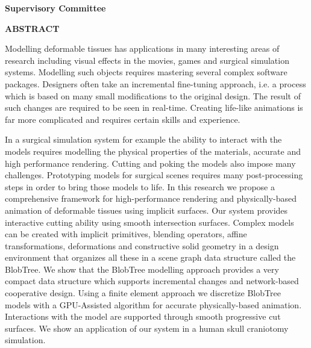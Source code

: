 \pagebreak
\newpage
{}

\noindent \textbf{Supervisory Committee}
\tpbreak
\panel

\begin{center}
\textbf{ABSTRACT}
\end{center}
Modelling deformable tissues has applications in many interesting areas of research
including visual effects in the movies, games and surgical simulation systems. Modelling
such objects requires mastering several complex software packages. Designers
often take an incremental fine-tuning approach, i.e. a process which is based on many
small modifications to the original design. The result of such changes are required
to be seen in real-time. Creating life-like animations is far more complicated and
requires certain skills and experience.

In a surgical simulation system for example the ability to interact with the models
requires modelling the physical properties of the materials,
accurate and high performance rendering. Cutting and poking the models
also impose many challenges. Prototyping models for surgical scenes requires many
post-processing steps in order to bring those models to life.
In this research we propose a comprehensive framework for high-performance rendering
and physically-based animation of deformable  tissues using implicit surfaces.
Our system provides interactive cutting ability using smooth intersection surfaces.
Complex models can be created with implicit primitives, blending operators, affine
transformations, deformations and constructive solid geometry in a design environment that organizes
all these in a scene graph data structure called the BlobTree. We show that the
BlobTree modelling approach provides a very compact data structure which supports
incremental changes and network-based cooperative design.
Using a finite element approach we discretize BlobTree models with a GPU-Assisted
algorithm for accurate physically-based animation. Interactions with the model are
supported through smooth progressive cut surfaces. We show an application of our
system in a human skull craniotomy simulation.


\pagebreak


